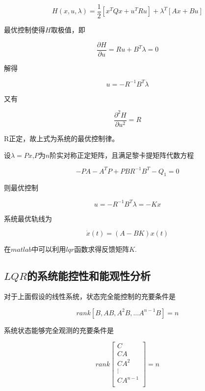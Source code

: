 \documentclass{MathorCupmodeling}
\begin{document}
\begin{equation}
H(x,u,\lambda)=\frac{1}{2}[x^TQx+u^TRu]+\lambda^T[Ax+Bu]
\end{equation}

最优控制使得$H$取极值，即

\begin{equation}
\frac{\partial H}{\partial u}=Ru+B^T\lambda=0
\end{equation}

解得

\begin{equation}
u=-R^{-1}B^T\lambda
\end{equation}

又有

\begin{equation}
\frac{\partial^2 H}{\partial u^2}=R
\end{equation}

R正定，故上式为系统的最优控制律。

设$\lambda=Px$,$P$为$n$阶实对称正定矩阵，且满足黎卡提矩阵代数方程

\begin{equation}
-PA-A^TP+PBR^{-1}B^T-Q_1=0
\end{equation}

则最优控制

\begin{equation}
u=-R^{-1}B^T\lambda=-Kx
\end{equation}

系统最优轨线为

\begin{equation}
\dot x(t)=(A-BK)x(t)
\end{equation}

在$matlab$中可以利用$lqr$函数求得反馈矩阵$K$.

\subsection{$LQR$的系统能控性和能观性分析}

对于上面假设的线性系统，状态完全能控制的充要条件是

\begin{equation}
rank[B,AB,A^2B,\dots A^{n-1}B]=n
\end{equation}

系统状态能够完全观测的充要条件是

\begin{equation}
rank
\begin{bmatrix}
C\\
CA\\
CA^2\\
\vdots\\
CA^{n-1}\\
\end{bmatrix}
=n
\end{equation}
\end{document}
